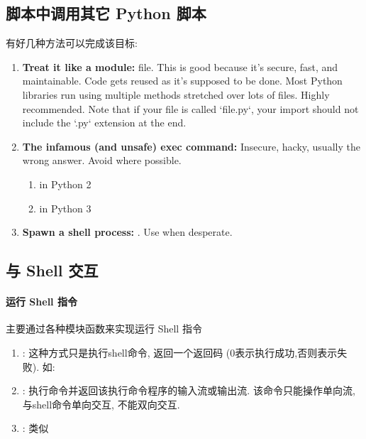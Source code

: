     \subsection{脚本中调用其它 Python 脚本}
        \hspace*{2em} 有好几种方法可以完成该目标:
            \begin{enumerate}
                \item \textbf{Treat it like a module:}  file. This is good because it's secure, fast, and maintainable. Code gets reused as it's supposed to be done. Most Python libraries run using multiple methods stretched over lots of files. Highly recommended. Note that if your file is called `file.py`, your import should not include the `.py` extension at the end.
                \item \textbf{The infamous (and unsafe) exec command:} Insecure, hacky, usually the wrong answer. Avoid where possible.
                    \begin{enumerate}
                        \item {} in Python 2
                        \item {} in Python 3
                    \end{enumerate}
                \item \textbf{Spawn a shell process:} . Use when desperate.
            \end{enumerate}

    \subsection{与 Shell 交互}
        \paragraph{运行 Shell 指令 \\}
            \hspace*{2em} 主要通过各种模块函数来实现运行 Shell 指令
                \begin{enumerate}
                    \item {}: 这种方式只是执行shell命令, 返回一个返回码 (0表示执行成功,否则表示失败). 如:
                    \item {}: 执行命令并返回该执行命令程序的输入流或输出流. 该命令只能操作单向流, 与shell命令单向交互, 不能双向交互.
                    \item {}: 类似 
                \end{enumerate}

